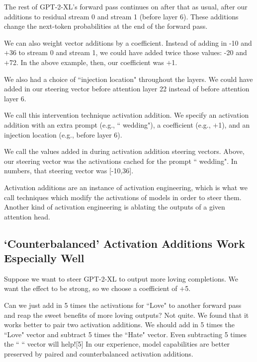 \documentclass[10pt]{article}
\begin{document}
The rest of GPT-2-XL's forward pass continues on after that as usual, after our additions to residual stream 0 and stream 1 (before layer 6). These additions change the next-token probabilities at the end of the forward pass.

We can also weight vector additions by a coefficient. Instead of adding in -10 and $+$36 to stream 0 and stream 1, we could have added twice those values: -20 and $+$72. In the above example, then, our coefficient was $+$1.

We also had a choice of ``injection location" throughout the layers. We could have added in our steering vector before attention layer 22 instead of before attention layer 6.

We call this intervention technique activation addition. We specify an activation addition with an extra prompt (e.g., `` wedding"), a coefficient (e.g., $+$1), and an injection location (e.g., before layer 6). 

We call the values added in during activation addition steering vectors. Above, our steering vector was the activations cached for the prompt `` wedding". In numbers, that steering vector was [-10,36].

Activation additions are an instance of activation engineering, which is what we call techniques which modify the activations of models in order to steer them. Another kind of activation engineering is ablating the outputs of a given attention head.

\subsection{`Counterbalanced' Activation Additions Work Especially Well}
Suppose we want to steer GPT-2-XL to output more loving completions. We want the effect to be strong, so we choose a coefficient of $+$5. 

Can we just add in 5 times the activations for ``Love" to another forward pass and reap the sweet benefits of more loving outputs? Not quite. We found that it works better to pair two activation additions. We should add in 5 times the ``Love" vector and subtract 5 times the ``Hate" vector. Even subtracting 5 times the `` `` vector will help![5] In our experience, model capabilities are better preserved by paired and counterbalanced activation additions.
\end{document}
